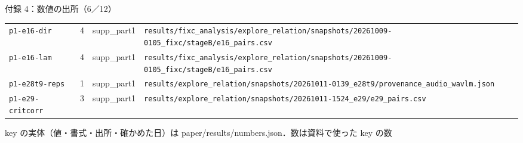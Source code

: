 \begin{frame}{付録 4：数値の出所（6／12）}
\begin{tabularx}{\textwidth}{@{}l r l X@{}}
    \texttt{p1-e16-dir} & 4 & supp\_part1 & \texttt{results/\allowbreak{}fixc\_\allowbreak{}analysis/\allowbreak{}explore\_\allowbreak{}relation/\allowbreak{}snapshots/\allowbreak{}20261009-0105\_\allowbreak{}fixc/\allowbreak{}stageB/\allowbreak{}e16\_\allowbreak{}pairs.csv} \\
    \texttt{p1-e16-lam} & 4 & supp\_part1 & \texttt{results/\allowbreak{}fixc\_\allowbreak{}analysis/\allowbreak{}explore\_\allowbreak{}relation/\allowbreak{}snapshots/\allowbreak{}20261009-0105\_\allowbreak{}fixc/\allowbreak{}stageB/\allowbreak{}e16\_\allowbreak{}pairs.csv} \\
    \texttt{p1-e28t9-reps} & 1 & supp\_part1 & \texttt{results/\allowbreak{}explore\_\allowbreak{}relation/\allowbreak{}snapshots/\allowbreak{}20261011-0139\_\allowbreak{}e28t9/\allowbreak{}provenance\_\allowbreak{}audio\_\allowbreak{}wavlm.json} \\
    \texttt{p1-e29-critcorr} & 3 & supp\_part1 & \texttt{results/\allowbreak{}explore\_\allowbreak{}relation/\allowbreak{}snapshots/\allowbreak{}20261011-1524\_\allowbreak{}e29/\allowbreak{}e29\_\allowbreak{}pairs.csv} \\
    \bottomrule
  \end{tabularx}\par
  {\raggedright\tiny key の実体（値・書式・出所・確かめた日）は paper/results/numbers.json．数は資料で使った key の数\par}
\end{frame}
